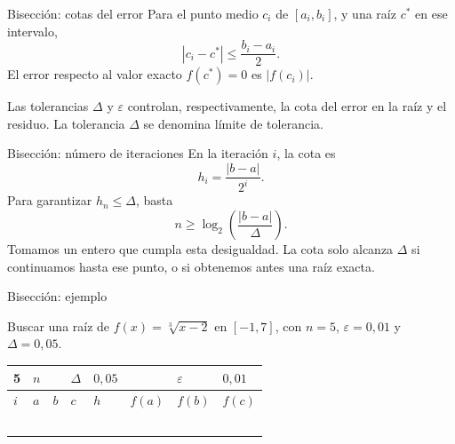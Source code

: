 \documentclass[main.tex]{subfiles}
\begin{document}
\begin{frame}{Bisección: cotas del error}
Para el punto medio $c_i$ de $[a_i,b_i]$, y una raíz $c^*$ en ese intervalo,\[|c_i-c^*|\le\frac{b_i-a_i}{2}.\]El error respecto al valor exacto $f(c^*)=0$ es $|f(c_i)|$.\par\medskip Las tolerancias $\Delta$ y $\varepsilon$ controlan, respectivamente, la cota del error en la raíz y el residuo. La tolerancia $\Delta$ se denomina límite de tolerancia.
\end{frame}

\begin{frame}{Bisección: número de iteraciones}
En la iteración $i$, la cota es\[h_i=\frac{|b-a|}{2^i}.\]Para garantizar $h_n\le\Delta$, basta\[n\ge\log_2\!\left(\frac{|b-a|}{\Delta}\right).\]Tomamos un entero que cumpla esta desigualdad. La cota solo alcanza $\Delta$ si continuamos hasta ese punto, o si obtenemos antes una raíz exacta.
\end{frame}

\begin{frame}[t]{Bisección: ejemplo}
\begin{minipage}[t][13mm][t]{\textwidth}\small Buscar una raíz de $f(x)=\sqrt[3]{x-2}$ en $[-1,7]$, con $n=5$, $\varepsilon=0{,}01$ y $\Delta=0{,}05$.\end{minipage}\par{\scriptsize\setlength{\tabcolsep}{2pt}\renewcommand{\arraystretch}{1}\begin{center}\begin{tabular}{|C{.04\textwidth}|C{.112\textwidth}|C{.112\textwidth}|C{.112\textwidth}|C{.112\textwidth}|C{.112\textwidth}|C{.112\textwidth}|C{.112\textwidth}|}
\hline
\rule{0pt}{4.3mm}5 & $n$ &  &  $\Delta$  & $0{,}05$ &  & $\varepsilon$ & $0{,}01$\\\hline
\rule{0pt}{4.3mm}$i$ & $a$ & $b$ & $c$ & $h$ & $f(a)$ & $f(b)$ & $f(c)$\\\hline
\rule{0pt}{4.3mm} &  &  &  &  &  &  & \\\hline
\rule{0pt}{4.3mm} &  &  &  &  &  &  & \\\hline
\rule{0pt}{4.3mm} &  &  &  &  &  &  & \\\hline
\rule{0pt}{4.3mm} &  &  &  &  &  &  & \\\hline
\rule{0pt}{4.3mm} &  &  &  &  &  &  & \\\hline
\end{tabular}\end{center}}\begin{minipage}[t][10mm][t]{\textwidth}\footnotesize \end{minipage}
\end{frame}
\end{document}
